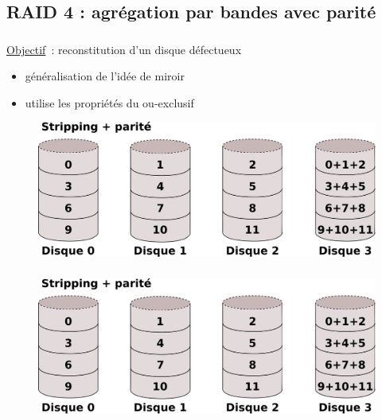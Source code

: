 \subsection{RAID 4 : agrégation par bandes avec parité}
\begin{frame}
  \frametitle{\large{\insertsubsection}}
  \underline{Objectif}~: \alert{reconstitution} d'un disque défectueux
  \begin{itemize}
  \item généralisation de l'idée de \alert{miroir}
  \item utilise les propriétés du \alert{ou-exclusif}
  \end{itemize}
  \begin{figure}
    \includegraphics[width=1\linewidth]{fig3/RAID4}
  \end{figure}
\end{frame}


\begin{frame}
\frametitle{\large{\insertsubsection}}
  \begin{figure}
    \includegraphics[width=1\linewidth]{fig3/RAID4}
  \end{figure}
\end{frame}



